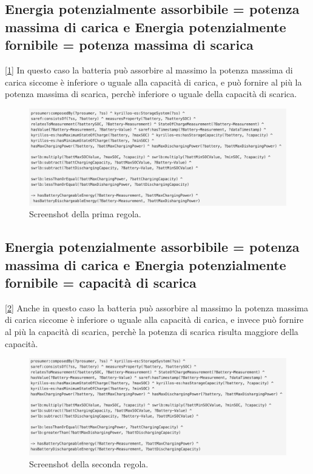 \subsection{Energia potenzialmente assorbibile = potenza massima di carica e Energia potenzialmente fornibile = potenza massima di scarica}
[\ref*{fig:bothlessorequal}] In questo caso la batteria può assorbire al massimo la potenza massima di carica siccome è inferiore o uguale alla capacità di carica,
e può fornire al più la potenza massima di scarica, perchè inferiore o uguale della capacità di scarica.

\begin{figure}[H]
    \centering
    \includegraphics[width=15cm]{images/both <=.png}
    \caption{Screenshot della prima regola.}
    \label{fig:bothlessorequal}
\end{figure}


\subsection{Energia potenzialmente assorbibile = potenza massima di carica e Energia potenzialmente fornibile = capacità di scarica}
[\ref*{fig:charginglessorequal}]  Anche in questo caso la batteria può assorbire al massimo la potenza massima di carica siccome è inferiore o uguale alla capacità di carica,
e invece può fornire al più la capacità di scarica, perchè la potenza di scarica risulta maggiore della capacità.


\begin{figure}[H]
    \centering
    \includegraphics[width=15cm]{images/charging <=.png}
    \caption{Screenshot della seconda regola.}
    \label{fig:charginglessorequal}
\end{figure}


